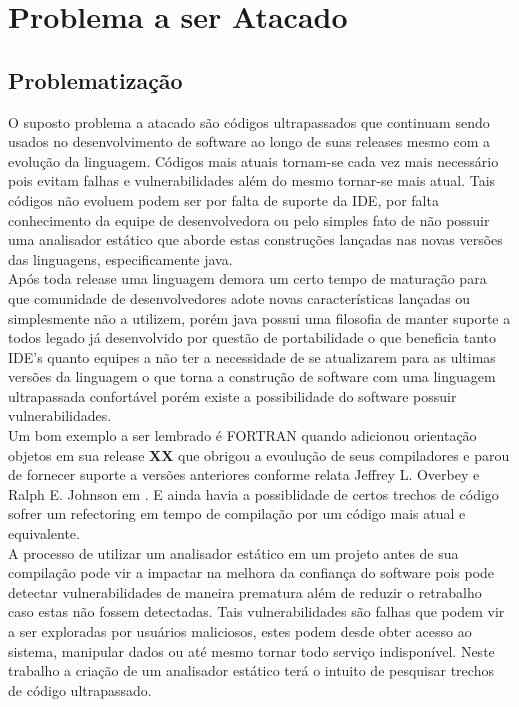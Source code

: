 \chapter{Problema a ser Atacado}
\section{Problematização}
O suposto problema a atacado são códigos ultrapassados que continuam sendo usados no desenvolvimento de software ao longo de suas releases mesmo com a evolução da linguagem. Códigos mais atuais tornam-se cada vez mais necessário pois evitam falhas e vulnerabilidades além do mesmo tornar-se mais atual. Tais códigos não evoluem podem ser por falta de suporte da IDE, por falta conhecimento da equipe de desenvolvedora ou pelo simples fato de não possuir uma analisador estático que aborde estas construções lançadas nas novas versões das linguagens, especificamente java.\\


Após toda release uma linguagem demora um certo tempo de maturação para que comunidade de desenvolvedores adote novas características lançadas ou simplesmente não a utilizem, porém java possui uma filosofia de manter suporte a todos legado já desenvolvido por questão de portabilidade o que beneficia tanto IDE's quanto equipes a não ter a necessidade de se atualizarem para as ultimas versões da linguagem o que torna a construção de software com uma linguagem ultrapassada confortável porém existe a possibilidade do software possuir vulnerabilidades.\\

Um bom exemplo a ser lembrado é FORTRAN quando adicionou orientação objetos em sua release \textbf{XX} que obrigou a evoulução de seus compiladores e parou de fornecer suporte a versões anteriores conforme relata Jeffrey L. Overbey e Ralph E. Johnson em \cite{Overbey:2009:RLR:1639949.1640127}. E ainda havia a possiblidade de certos trechos de código sofrer um refectoring em tempo de compilação por um código mais atual e equivalente.\\

A processo de utilizar um analisador estático em um projeto antes de sua compilação pode vir a impactar na melhora da confiança do software pois pode detectar vulnerabilidades de maneira prematura além de reduzir o retrabalho caso estas não fossem detectadas. Tais vulnerabilidades são falhas que podem vir a ser exploradas por usuários maliciosos, estes podem desde obter acesso ao sistema, manipular dados ou até mesmo tornar todo serviço indisponível. Neste trabalho a criação de um analisador estático terá o intuito de pesquisar trechos de código ultrapassado.\\

